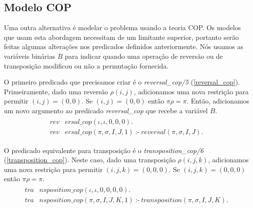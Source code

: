 
\subsection{Modelo COP}
\label{subsec:modelcop}
Uma outra alternativa é modelar o problema usando a teoria COP. Os
modelos que usam esta abordagem necessitam de um limitante superior,
portanto serão feitas algumas alterações nos predicados definidos
anteriormente. Nós usamos as variáveis binárias $B$ para indicar
quando uma operação de reversão ou de transposição modificou ou não a
permutação fornecida.

O primeiro predicado que precisamos criar é o \textit{reversal\_cop/5}
(\ref{reversal_cop}). Primeiramente, dado uma reversão $\rho(i, j)$,
adicionamos uma nova restrição para permitir $(i, j) = (0, 0)$. Se
$(i, j) = (0, 0)$ então $\pi\rho = \pi$. Então, adicionamos um novo
argumento ao predicado \textit{reversal\_cop} que recebe a variável
$B$.
\begin{align}
  \label{reversal_cop}
  \begin{split}
  \textit{rev}&\textit{ersal\_cop}(\iota, \iota, 0, 0, 0). \\
  \textit{rev}&\textit{ersal\_cop}(\pi, \sigma, I, J, 1)~\text{:-}~ 
  \textit{reversal}(\pi, \sigma, I, J).
  \end{split}
\end{align}

O predicado equivalente para transposição é
o \textit{transposition\_cop/6} (\ref{transposition_cop}). Neste caso,
dado uma transposição $\rho(i, j, k)$, adicionamos uma nova restrição
para permitir $(i, j, k) = (0, 0, 0)$. Se $(i, j, k) = (0, 0, 0)$
então $\pi\rho = \pi$.
\begin{align}
  \label{transposition_cop}
  \begin{split}
  \textit{tra}&\textit{nsposition\_cop}(\iota, \iota, 0, 0, 0, 0). \\
  \textit{tra}&\textit{nsposition\_cop}(\pi, \sigma, I, J, K, 1)~\text{:-}~ 
  \textit{transposition}(\pi, \sigma, I, J, K). 
  \end{split}
\end{align}

